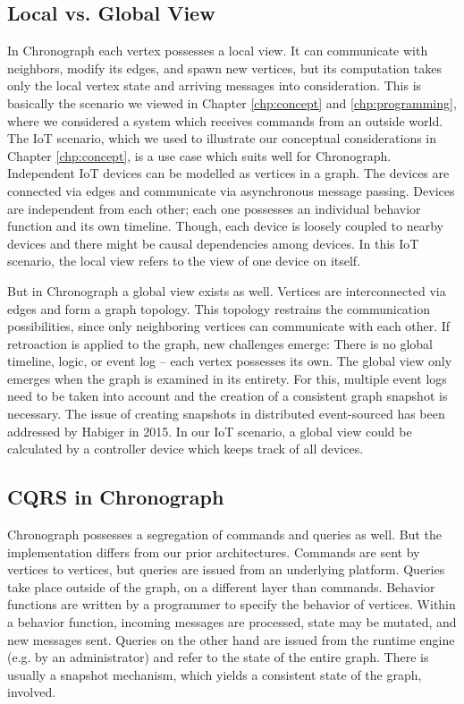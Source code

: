 \subsection{Local vs. Global View}
In Chronograph each vertex possesses a local view. It can communicate with 
neighbors, modify its edges, and spawn new vertices, but its computation takes 
only the local vertex state and arriving messages into consideration. 
This is basically the scenario we viewed in Chapter \ref{chp:concept} and
\ref{chp:programming}, where we considered a system which receives commands 
from an outside world.
The IoT scenario, which we used to illustrate our conceptual considerations
in Chapter \ref{chp:concept}, is a use case which suits well for Chronograph.
Independent IoT devices can be modelled as vertices in a graph. The devices
are connected via edges and communicate via asynchronous message passing.
Devices are independent from each other; each one possesses an individual 
behavior function and its own timeline. Though, each device is loosely coupled 
to nearby devices and there might be causal dependencies among devices.
In this IoT scenario, the local view refers to the view of one device on itself.

But in Chronograph a global view exists as well. Vertices are interconnected 
via edges and form a graph topology. This topology restrains the communication 
possibilities, since only neighboring vertices can communicate with each other. 
If retroaction is applied to the graph, new challenges emerge:
There is no global timeline, logic, or event log -- each vertex possesses its 
own. The global view only emerges when the graph is examined in its entirety.
For this, multiple event logs need to be taken into account and the creation of 
a consistent graph snapshot is necessary.
The issue of creating snapshots in distributed event-sourced has been addressed 
by Habiger \cite{Habiger2015} in 2015.
In our IoT scenario, a global view could be calculated by a controller device 
which keeps track of all devices.

\subsection{CQRS in Chronograph}
Chronograph possesses a segregation of commands and queries as well. But the
implementation differs from our prior architectures.
Commands are sent by vertices to vertices, but queries are issued from an 
underlying platform. Queries take place outside of the graph, on a different 
layer than commands.
Behavior functions are written by a programmer to specify the behavior of 
vertices. Within a behavior function, incoming messages are processed, state 
may be mutated, and new messages sent.
Queries on the other hand are issued from the runtime engine (e.g. by an 
administrator) and refer to the state of the entire graph. There is usually 
a snapshot mechanism, which yields a consistent state of the graph, involved.

